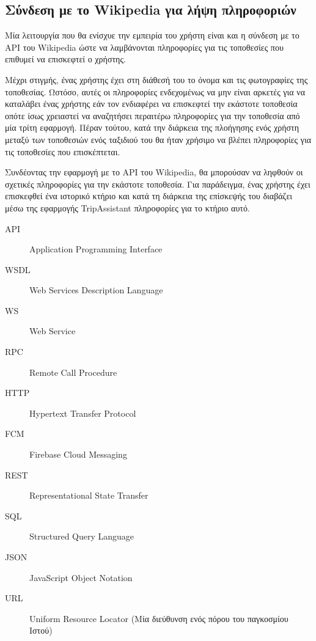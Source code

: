 \documentclass[oneside, 12pt]{book}
\begin{document}
\subsection{Σύνδεση με το Wikipedia για λήψη πληροφοριών}
Μία λειτουργία που θα ενίσχυε την εμπειρία του χρήστη είναι και η σύνδεση με το API του Wikipedia ώστε να λαμβάνονται πληροφορίες για τις τοποθεσίες που επιθυμεί να επισκεφτεί ο χρήστης. 

Μέχρι στιγμής, ένας χρήστης έχει στη διάθεσή του το όνομα και τις φωτογραφίες της τοποθεσίας. Ωστόσο, αυτές οι πληροφορίες ενδεχομένως να μην είναι αρκετές για να καταλάβει ένας χρήστης εάν τον ενδιαφέρει να επισκεφτεί την εκάστοτε τοποθεσία οπότε ίσως χρειαστεί να αναζητήσει περαιτέρω πληροφορίες για την τοποθεσία από μία τρίτη εφαρμογή. Πέραν τούτου, κατά την διάρκεια της πλοήγησης ενός χρήστη μεταξύ των τοποθεσιών ενός ταξιδιού του θα ήταν χρήσιμο να βλέπει πληροφορίες για τις τοποθεσίες που επισκέπτεται.

Συνδέοντας την εφαρμογή με το API του Wikipedia, θα μπορούσαν να ληφθούν οι σχετικές πληροφορίες για την εκάστοτε τοποθεσία.  
Για παράδειγμα, ένας χρήστης έχει επισκεφθεί ένα ιστορικό κτήριο και κατά τη διάρκεια της επίσκεψής του διαβάζει μέσω της εφαρμογής TripAssistant πληροφορίες για το κτήριο αυτό.
\begin{Glossary}
\begin{description}
\item[API] Application Programming Interface
\item[WSDL] Web Services Description Language
\item[WS] Web Service
\item[RPC] Remote Call Procedure
\item[HTTP] Hypertext Transfer Protocol
\item[FCM] Firebase Cloud Messaging
\item[REST] Representational State Transfer
\item[SQL] Structured Query Language
\item[JSON] JavaScript Object Notation  
\item[URL] Uniform Resource Locator (Μία διεύθυνση ενός πόρου του παγκοσμίου Ιστού)
\end{description}
\end{Glossary}

\printbibliography

\lastpageinfo
\end{document}
